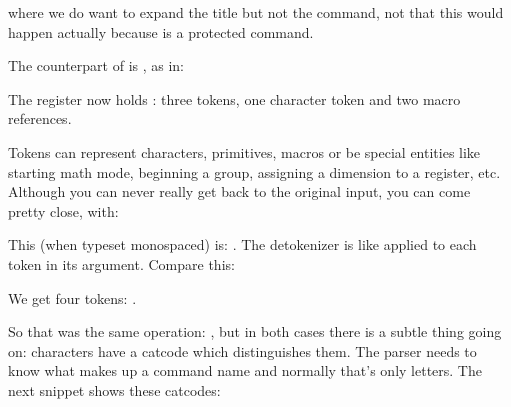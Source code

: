 \starttyping[option=TEX]
\stoptyping

where we do want to expand the title but not the \type {\chapter} command, not
that this would happen actually because \type {\chapter} is a protected command.

The counterpart of \type {\normalexpanded} is \type {\normalunexpanded}, as in:

\startbuffer
\def\MyMacroA{a}
\def\MyMacroB{b}
\normalprotected{}
\normalexpanded {\scratchtoks
    {\MyMacroA\normalunexpanded {\MyMacroB}\MyMacroC}}
\stopbuffer

\typebuffer[option=TEX] \getbuffer

The register now holds \MyShow: three tokens, one character token and two
macro references.

Tokens can represent characters, primitives, macros or be special entities like
starting math mode, beginning a group, assigning a dimension to a register, etc.
Although you can never really get back to the original input, you can come pretty
close, with:

\startbuffer
{}
\stopbuffer

\typebuffer[option=TEX]

This (when typeset monospaced) is: {\tt \inlinebuffer}. The detokenizer is like
\type {\string} applied to each token in its argument. Compare this:

\startbuffer
\normalexpanded {
    \normaldetokenize{10pt}
}
\stopbuffer

\typebuffer[option=TEX]

We get four tokens: {\tt\inlinebuffer}.

\startbuffer
{}
\stopbuffer

\typebuffer[option=TEX]

So that was the same operation: {\tt\inlinebuffer}, but in both cases there is a
subtle thing going on: characters have a catcode which distinguishes them. The
parser needs to know what makes up a command name and normally that's only
letters. The next snippet shows these catcodes:

